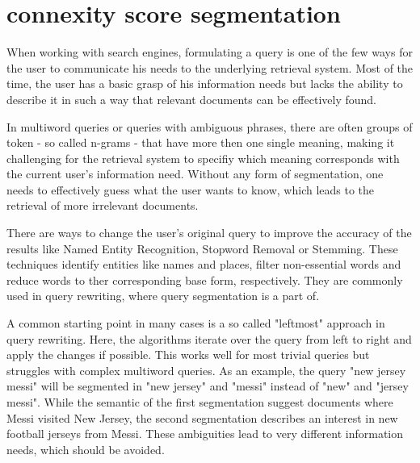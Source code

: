 \section{connexity score segmentation} \label{approach1}

When working with search engines, formulating a query is one of the few ways for the user to communicate his needs to the underlying retrieval system. Most of the time, the user has a basic grasp of his information needs but lacks the ability to describe it in such a way that relevant documents can be effectively found. 

In multiword queries or queries with ambiguous phrases, there are often groups of token - so called n-grams - that have more then one single meaning, making it challenging for the retrieval system to specifiy which meaning corresponds with the current user's information need. Without any form of segmentation, one needs to effectively guess what the user wants to know, which leads to the retrieval of more irrelevant documents. 

There are ways to change the user's original query to improve the accuracy of the results like Named Entity Recognition, Stopword Removal or Stemming.
These techniques identify entities like names and places, filter non-essential words and reduce words to ther corresponding base form, respectively. They are commonly used in query rewriting, where query segmentation is a part of.

A common starting point in many cases is a so called "leftmost" approach in query rewriting. Here, the algorithms iterate over the query from left to right and apply the changes if possible. This works well for most trivial queries but struggles with complex multiword queries. As an example, the query "new jersey messi" will be segmented in "new jersey" and "messi" instead of "new" and "jersey messi". While the semantic of the first segmentation suggest documents where Messi visited New Jersey, the second segmentation describes an interest in new football jerseys from Messi. These ambiguities lead to very different information needs, which should be avoided. 

